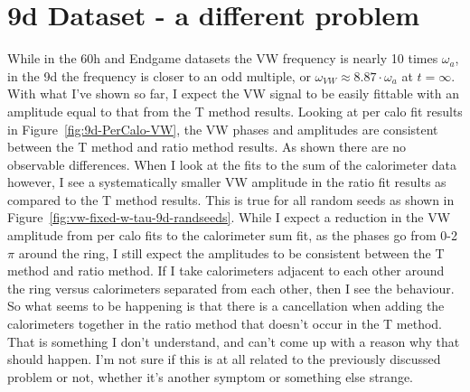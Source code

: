 \documentclass[12pt,letterpaper]{article}
\newcommand{\figref}[1]{Figure~\ref{#1}}
\def\wa{$\omega_{a}$\xspace}
\begin{document}






\clearpage






\section{9d Dataset - a different problem}


While in the 60h and Endgame datasets the VW frequency is nearly 10 times \wa, in the 9d the frequency is closer to an odd multiple, or $\omega_{VW} \approx 8.87 \cdot \omega_{a}$ at $t = \infty$. With what I've shown so far, I expect the VW signal to be easily fittable with an amplitude equal to that from the T method results. Looking at per calo fit results in \figref{fig:9d-PerCalo-VW}, the VW phases and amplitudes are consistent between the T method and ratio method results. As shown there are no observable differences. When I look at the fits to the sum of the calorimeter data however, I see a systematically smaller VW amplitude in the ratio fit results as compared to the T method results. This is true for all random seeds as shown in \figref{fig:vw-fixed-w-tau-9d-randseeds}. While I expect a reduction in the VW amplitude from per calo fits to the calorimeter sum fit, as the phases go from 0-2$\pi$ around the ring, I still expect the amplitudes to be consistent between the T method and ratio method. If I take calorimeters adjacent to each other around the ring versus calorimeters separated from each other, then I see the behaviour. So what seems to be happening is that there is a cancellation when adding the calorimeters together in the ratio method that doesn't occur in the T method. That is something I don't understand, and can't come up with a reason why that should happen. I'm not sure if this is at all related to the previously discussed problem or not, whether it's another symptom or something else strange. 
\end{document}
